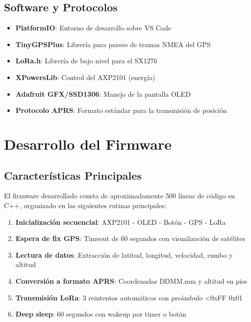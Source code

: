 \documentclass[conference]{IEEEtran}
\begin{document}
\subsection{Software y Protocolos}

\begin{itemize}
    \item \textbf{PlatformIO}: Entorno de desarrollo sobre VS Code
    \item \textbf{TinyGPSPlus}: Librería para parseo de tramas NMEA del GPS
    \item \textbf{LoRa.h}: Librería de bajo nivel para el SX1276
    \item \textbf{XPowersLib}: Control del AXP2101 (energía)
    \item \textbf{Adafruit GFX/SSD1306}: Manejo de la pantalla OLED
    \item \textbf{Protocolo APRS}: Formato estándar para la transmisión de posición
\end{itemize}

\section{Desarrollo del Firmware}

\subsection{Características Principales}

El firmware desarrollado consta de aproximadamente 500 líneas de código en C++, organizado en las siguientes rutinas principales:

\begin{enumerate}
    \item \textbf{Inicialización secuencial}: AXP2101 - OLED - Botón - GPS - LoRa
    \item \textbf{Espera de fix GPS}: Timeout de 60 segundos con visualización de satélites
    \item \textbf{Lectura de datos}: Extracción de latitud, longitud, velocidad, rumbo y altitud
    \item \textbf{Conversión a formato APRS}: Coordenadas DDMM.mm y altitud en pies
    \item \textbf{Transmisión LoRa}: 3 reintentos automáticos con preámbulo \textless 0xFF 0x01
    \item \textbf{Deep sleep}: 60 segundos con wakeup por timer o botón
\end{enumerate}
\end{document}
